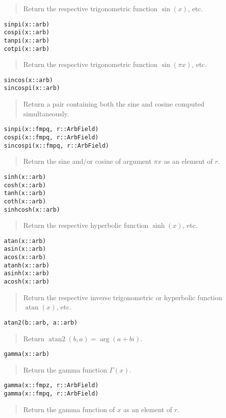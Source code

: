 \documentclass[a4paper,10pt]{article}
\newcommand{\desc}[1]{\vspace{-3mm}\begin{quote}#1\end{quote}}
\begin{document}
{{\desc{Return the respective trigonometric function $\sin(x)$, etc.}

\begin{lstlisting}
sinpi(x::arb)
cospi(x::arb)
tanpi(x::arb)
cotpi(x::arb)
\end{lstlisting}

\desc{Return the respective trigonometric function $\sin(\pi x)$, etc.}

\begin{lstlisting}
sincos(x::arb)
sincospi(x::arb)
\end{lstlisting}

\desc{Return a pair containing both the sine and cosine computed simultaneously.}

\begin{lstlisting}
sinpi(x::fmpq, r::ArbField)
cospi(x::fmpq, r::ArbField)
sincospi(x::fmpq, r::ArbField)
\end{lstlisting}

\desc{Return the sine and/or cosine of argument $\pi x$ as an element of $r$.}

\begin{lstlisting}
sinh(x::arb)
cosh(x::arb)
tanh(x::arb)
coth(x::arb)
sinhcosh(x::arb)
\end{lstlisting}

\desc{Return the respective hyperbolic function $\sinh(x)$, etc.}

\begin{lstlisting}
atan(x::arb)
asin(x::arb)
acos(x::arb)
atanh(x::arb)
asinh(x::arb)
acosh(x::arb)
\end{lstlisting}

\desc{Return the respective inverse trigonometric or hyperbolic function
$\operatorname{atan}(x)$, etc.}

\begin{lstlisting}
atan2(b::arb, a::arb)
\end{lstlisting}

\desc{Return $\operatorname{atan2}(b,a) = \arg(a+bi)$.}

\begin{lstlisting}
gamma(x::arb)
\end{lstlisting}

\desc{Return the gamma function $\Gamma(x)$.}

\begin{lstlisting}
gamma(x::fmpz, r::ArbField)
gamma(x::fmpq, r::ArbField)
\end{lstlisting}

\desc{Return the gamma function of $x$ as an element of $r$.}

}}
\end{document}
